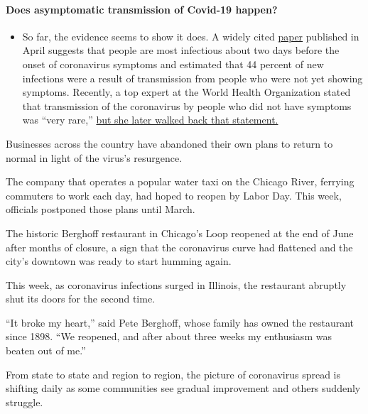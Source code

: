 \begin{itemize}
{  \paragraph{Does asymptomatic transmission of Covid-19
  happen?}\label{does-asymptomatic-transmission-of-covid-19-happen}}

  \begin{itemize}
  \tightlist
  \item
    So far, the evidence seems to show it does. A widely cited
    \href{https://www.nature.com/articles/s41591-020-0869-5}{paper}
    published in April suggests that people are most infectious about
    two days before the onset of coronavirus symptoms and estimated that
    44 percent of new infections were a result of transmission from
    people who were not yet showing symptoms. Recently, a top expert at
    the World Health Organization stated that transmission of the
    coronavirus by people who did not have symptoms was ``very rare,''
    \href{https://www.nytimes3xbfgragh.onion/2020/06/09/world/coronavirus-updates.html?action=click\&pgtype=Article\&state=default\&region=MAIN_CONTENT_3\&context=storylines_faq\#link-1f302e21}{but
    she later walked back that statement.}
  \end{itemize}
\end{itemize}

Businesses across the country have abandoned their own plans to return
to normal in light of the virus's resurgence.

The company that operates a popular water taxi on the Chicago River,
ferrying commuters to work each day, had hoped to reopen by Labor Day.
This week, officials postponed those plans until March.

The historic Berghoff restaurant in Chicago's Loop reopened at the end
of June after months of closure, a sign that the coronavirus curve had
flattened and the city's downtown was ready to start humming again.

This week, as coronavirus infections surged in Illinois, the restaurant
abruptly shut its doors for the second time.

``It broke my heart,'' said Pete Berghoff, whose family has owned the
restaurant since 1898. ``We reopened, and after about three weeks my
enthusiasm was beaten out of me.''

From state to state and region to region, the picture of coronavirus
spread is shifting daily as some communities see gradual improvement and
others suddenly struggle.

